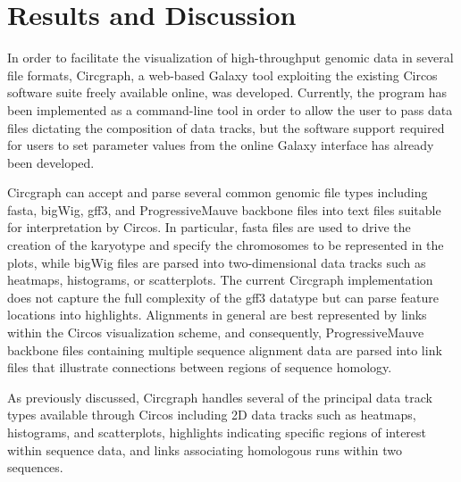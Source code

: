 \documentclass{article}
\begin{document}
\section*{Results and Discussion}

In order to facilitate the visualization of high-throughput genomic data in several file formats, Circgraph, a web-based Galaxy tool exploiting the existing Circos software suite freely available online, was developed. Currently, the program has been implemented as a command-line tool in order to allow the user to pass data files dictating the composition of data tracks, but the software support required for users to set parameter values from the online Galaxy interface has already been developed.

Circgraph can accept and parse several common genomic file types including fasta, bigWig, gff3, and ProgressiveMauve backbone files into text files suitable for interpretation by Circos. In particular, fasta files are used to drive the creation of the karyotype and specify the chromosomes to be represented in the plots, while bigWig files are parsed into two-dimensional data tracks such as heatmaps, histograms, or scatterplots. The current Circgraph implementation does not capture the full complexity of the gff3 datatype but can parse feature locations into highlights. Alignments in general are best represented by links within the Circos visualization scheme, and consequently, ProgressiveMauve backbone files containing multiple sequence alignment data are parsed into link files that illustrate connections between regions of sequence homology.  

As previously discussed, Circgraph handles several of the principal data track types available through Circos including 2D data tracks such as heatmaps, histograms, and scatterplots, highlights indicating specific regions of interest within sequence data, and links associating homologous runs within two sequences.
\end{document}
